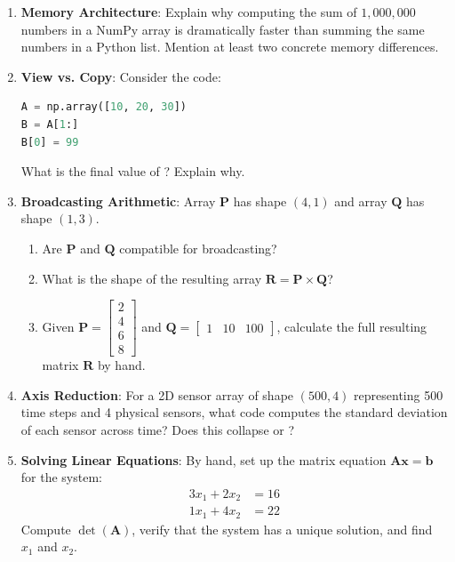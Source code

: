\begin{enumerate}
    \item \textbf{Memory Architecture}: Explain why computing the sum of $1{,}000{,}000$ numbers in a NumPy array is dramatically faster than summing the same numbers in a Python list. Mention at least two concrete memory differences.

    \item \textbf{View vs. Copy}: Consider the code:
\begin{lstlisting}[language=Python]
A = np.array([10, 20, 30])
B = A[1:]
B[0] = 99
\end{lstlisting}
    What is the final value of ? Explain why.

    \item \textbf{Broadcasting Arithmetic}: Array $\mathbf{P}$ has shape $(4, 1)$ and array $\mathbf{Q}$ has shape $(1, 3)$. 
    \begin{enumerate}[label=(\alph*)]
        \item Are $\mathbf{P}$ and $\mathbf{Q}$ compatible for broadcasting?
        \item What is the shape of the resulting array $\mathbf{R} = \mathbf{P} \times \mathbf{Q}$?
        \item Given $\mathbf{P} = \begin{bmatrix} 2 \\ 4 \\ 6 \\ 8 \end{bmatrix}$ and $\mathbf{Q} = \begin{bmatrix} 1 & 10 & 100 \end{bmatrix}$, calculate the full resulting matrix $\mathbf{R}$ by hand.
    \end{enumerate}

    \item \textbf{Axis Reduction}: For a 2D sensor array of shape $(500, 4)$ representing 500 time steps and 4 physical sensors, what code computes the standard deviation of each sensor across time? Does this collapse  or ?

    \item \textbf{Solving Linear Equations}: By hand, set up the matrix equation $\mathbf{A}\mathbf{x} = \mathbf{b}$ for the system:
    \begin{align*}
    3 x_1 + 2 x_2 &= 16 \\
    1 x_1 + 4 x_2 &= 22
    \end{align*}
    Compute $\det(\mathbf{A})$, verify that the system has a unique solution, and find $x_1$ and $x_2$.
\end{enumerate}

